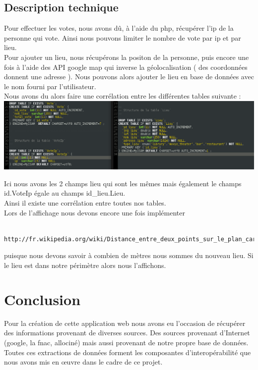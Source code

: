 \documentclass[10pt,a4paper]{report}
\begin{document}
\subsection{Description technique}
\begin{flushleft}
Pour effectuer les votes, nous avons dû, à l'aide du php, récupérer l'ip de la personne qui vote. Ainsi nous pouvons limiter le nombre de vote par ip et par lieu. \\

Pour ajouter un lieu, nous récupérons la positon de la personne, puis encore une fois à l'aide des API google map qui inverse la géolocalisation ( des coordonnées donnent une adresse ). Nous pouvons alors ajouter le lieu en base de données avec le nom fourni par l'utilisateur. \\

Nous avons du alors faire une corrélation entre les différentes tables suivante :
\includegraphics[scale=0.5]{./images/BDD_Vote_Lieu.png}

Ici nous avons les 2 champs lieu qui sont les mêmes mais également le champs id.VoteIp égale au champs id\_lieu.Lieu. \\


Ainsi il existe une corrélation entre toutes nos tables. \\

Lors de l'affichage nous devons encore une fois implémenter 
\begin{verbatim}
	http://fr.wikipedia.org/wiki/Distance_entre_deux_points_sur_le_plan_cart%C3%A9sien
\end{verbatim} 
puisque nous devons savoir à combien de mètres nous sommes du nouveau lieu.
Si le lieu est dans notre périmètre alors nous l'affichons.\\
\end{flushleft}



\section{Conclusion}
\begin{flushleft}
Pour la création de cette application web nous avons eu l'occasion de récupérer des informations provenant de diverses sources. Des sources provenant d'Internet (google, la fnac, allociné) mais aussi provenant de notre propre base de données. Toutes ces extractions de données forment les composantes d'interopérabilité que nous avons mis en œuvre dans le cadre de ce projet.
\end{flushleft}
\end{document}
